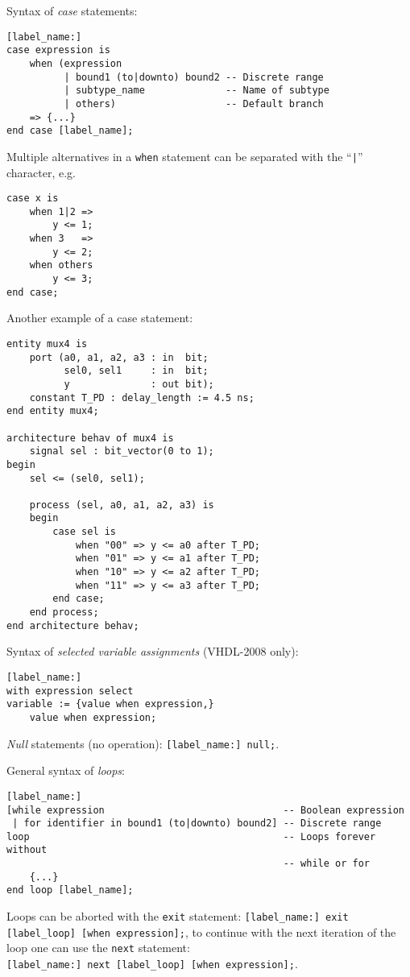 \documentclass[fontsize=11pt,a4paper]{scrartcl}
\begin{document}
Syntax of \emph{case} statements:
\begin{lstlisting}
[label_name:]
case expression is
	when (expression
	      | bound1 (to|downto) bound2 -- Discrete range
	      | subtype_name              -- Name of subtype
	      | others)                   -- Default branch
	=> {...}
end case [label_name];
\end{lstlisting}
Multiple alternatives in a \lstinline!when! statement can be separated with the ``\lstinline!|!'' character, e.g.
\begin{lstlisting}
case x is
	when 1|2 =>
		y <= 1;
	when 3   =>
		y <= 2;
	when others
		y <= 3;
end case;
\end{lstlisting}

Another example of a case statement:
\begin{lstlisting}
entity mux4 is
	port (a0, a1, a2, a3 : in  bit;
	      sel0, sel1     : in  bit;
	      y              : out bit);
	constant T_PD : delay_length := 4.5 ns;
end entity mux4;

architecture behav of mux4 is
	signal sel : bit_vector(0 to 1);
begin
	sel <= (sel0, sel1);

	process (sel, a0, a1, a2, a3) is
	begin
		case sel is
			when "00" => y <= a0 after T_PD;
			when "01" => y <= a1 after T_PD;
			when "10" => y <= a2 after T_PD;
			when "11" => y <= a3 after T_PD;
		end case;
	end process;
end architecture behav;
\end{lstlisting}

Syntax of \emph{selected variable assignments} (VHDL-2008 only):
\begin{lstlisting}
[label_name:]
with expression select
variable := {value when expression,}
	value when expression;
\end{lstlisting}

\emph{Null} statements (no operation): \lstinline![label_name:] null;!.

General syntax of \emph{loops}:
\begin{lstlisting}
[label_name:]
[while expression                               -- Boolean expression
 | for identifier in bound1 (to|downto) bound2] -- Discrete range
loop                                            -- Loops forever without
                                                -- while or for
	{...}
end loop [label_name];
\end{lstlisting}

Loops can be aborted with the \lstinline!exit! statement: \lstinline![label_name:] exit [label_loop] [when expression];!, to continue with the next iteration of the loop one can use the \lstinline!next! statement:\\ \lstinline![label_name:] next [label_loop] [when expression];!.
\end{document}
